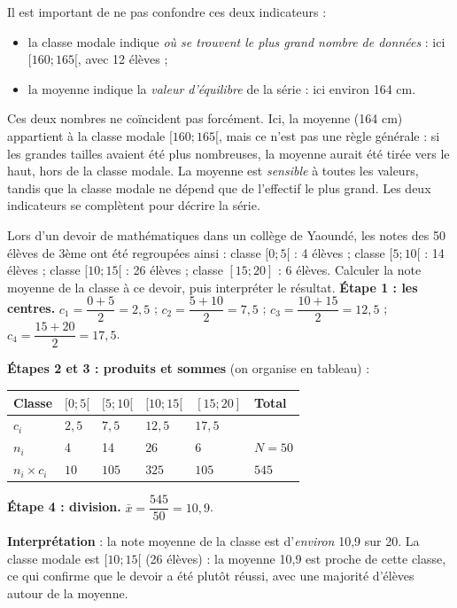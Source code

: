 \documentclass[11pt]{article}
\newcommand{\cle}[1]{{\popxbold\color{popdark}#1}}
\begin{document}
Il est important de ne pas confondre ces deux indicateurs :
\begin{itemize}
\item la \cle{classe modale} indique \emph{où se trouvent le plus grand nombre de données} : ici $[160 ; 165[$, avec 12 élèves ;
\item la \cle{moyenne} indique la \emph{valeur d'équilibre} de la série : ici environ 164 cm.
\end{itemize}
Ces deux nombres ne coïncident pas forcément. Ici, la moyenne (164 cm) appartient à la classe modale $[160 ; 165[$, mais ce n'est pas une règle générale : si les grandes tailles avaient été plus nombreuses, la moyenne aurait été \og tirée \fg{} vers le haut, hors de la classe modale. La moyenne est \emph{sensible} à toutes les valeurs, tandis que la classe modale ne dépend que de l'effectif le plus grand. Les deux indicateurs se complètent pour décrire la série.

\begin{exoresolu}
Lors d'un devoir de mathématiques dans un collège de Yaoundé, les notes des 50 élèves de 3ème ont été regroupées ainsi : classe $[0 ; 5[$ : 4 élèves ; classe $[5 ; 10[$ : 14 élèves ; classe $[10 ; 15[$ : 26 élèves ; classe $[15 ; 20]$ : 6 élèves. Calculer la note moyenne de la classe à ce devoir, puis interpréter le résultat.
\tcblower
\textbf{Étape 1 : les centres.} $c_1 = \dfrac{0+5}{2} = 2,5$ ; $c_2 = \dfrac{5+10}{2} = 7,5$ ; $c_3 = \dfrac{10+15}{2} = 12,5$ ; $c_4 = \dfrac{15+20}{2} = 17,5$.

\textbf{Étapes 2 et 3 : produits et sommes} (on organise en tableau) :
\begin{center}
\begin{tabularx}{\linewidth}{|l|X|X|X|X|X|}
\hline
\rowcolor{popblueL} Classe & $[0 ; 5[$ & $[5 ; 10[$ & $[10 ; 15[$ & $[15 ; 20]$ & \textbf{Total} \\
\hline
$c_i$ & $2,5$ & $7,5$ & $12,5$ & $17,5$ & \\
\hline
$n_i$ & 4 & 14 & 26 & 6 & $N = 50$ \\
\hline
$n_i \times c_i$ & $10$ & $105$ & $325$ & $105$ & $545$ \\
\hline
\end{tabularx}
\end{center}

\textbf{Étape 4 : division.} $\bar{x} = \dfrac{545}{50} = 10,9$.

\textbf{Interprétation} : la note moyenne de la classe est d'\emph{environ} 10,9 sur 20. La classe modale est $[10 ; 15[$ (26 élèves) : la moyenne 10,9 est proche de cette classe, ce qui confirme que le devoir a été plutôt réussi, avec une majorité d'élèves autour de la moyenne.
\end{exoresolu}
\end{document}
